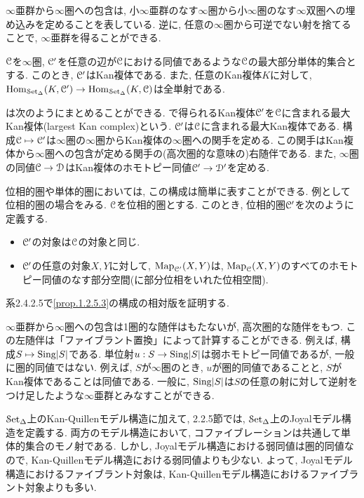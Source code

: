 \documentclass[uplatex, a4paper, 14Q, dvipdfmx]{jsreport}
\begin{document}
$\infty$亜群から$\infty$圏への包含は, 小$\infty$亜群のなす$\infty$圏から小$\infty$圏のなす$\infty$双圏への埋め込みを定めることを表している. 
逆に, 任意の$\infty$圏から可逆でない射を捨てることで, $\infty$亜群を得ることができる. 

\begin{proposition} \label{prop.1.2.5.3}
  $\mathcal{C}$を$\infty$圏, $\mathcal{C}'$を任意の辺が$\mathcal{C}$における同値であるような$\mathcal{C}$の最大部分単体的集合とする. 
  このとき, $\mathcal{C}'$はKan複体である. 
  また, 任意のKan複体$K$に対して, $\mathrm{Hom}_{\mathcal{S}\mathrm{et}_{\Delta}}(K,\mathcal{C}') \to \mathrm{Hom}_{\mathcal{S}\mathrm{et}_{\Delta}}(K,\mathcal{C})$は全単射である. 
\end{proposition}

は次のようにまとめることができる. 
で得られるKan複体$\mathcal{C}'$を$\mathcal{C}$に含まれる最大Kan複体(largest Kan complex)という.
$\mathcal{C}'$は$\mathcal{C}$に含まれる最大Kan複体である. 
構成$\mathcal{C} \mapsto \mathcal{C}'$は$\infty$圏の$\infty$圏からKan複体の$\infty$圏への関手を定める. 
この関手はKan複体から$\infty$圏への包含が定める関手の(高次圏的な意味の)右随伴である. 
また, $\infty$圏の同値$\mathcal{C} \to \mathcal{D}$はKan複体のホモトピー同値$\mathcal{C}' \to \mathcal{D}'$を定める. 

\begin{remark} \label{rem.1.2.5.4}
  位相的圏や単体的圏においては, この構成は簡単に表すことができる. 
  例として位相的圏の場合をみる. 
  $\mathcal{C}$を位相的圏とする. 
  このとき, 位相的圏$\mathcal{C}'$を次のように定義する. 
  \begin{itemize}
    \item $\mathcal{C}'$の対象は$\mathcal{C}$の対象と同じ.
    \item $\mathcal{C}'$の任意の対象$X,Y$に対して, $\mathrm{Map}_{\mathcal{C}'}(X,Y)$は, $\mathrm{Map}_{\mathcal{C}}(X,Y)$のすべてのホモトピー同値のなす部分空間(に部分位相をいれた位相空間). 
  \end{itemize}
\end{remark}

\begin{remark} \label{rem.1.2.5.5}
  系2.4.2.5で\cref{prop.1.2.5.3}の構成の相対版を証明する.
\end{remark}

$\infty$亜群から$\infty$圏への包含は1圏的な随伴はもたないが, 高次圏的な随伴をもつ. 
この左随伴は「ファイブラント置換」によって計算することができる.
例えば, 構成$S \mapsto \mathrm{Sing}|S|$である. 
単位射$u : S \to \mathrm{Sing}|S|$は弱ホモトピー同値であるが, 一般に圏的同値ではない.
例えば, $S$が$\infty$圏のとき, $u$が圏的同値であることと, $S$がKan複体であることは同値である. 
一般に, $\mathrm{Sing}|S|$は$S$の任意の射に対して逆射をつけ足したような$\infty$亜群とみなすことができる.

\begin{remark} \label{rem.1.2.5.6}
  $\mathcal{S}\mathrm{et}_{\Delta}$上のKan-Quillenモデル構造に加えて, 2.2.5節では, $\mathcal{S}\mathrm{et}_{\Delta}$上のJoyalモデル構造を定義する. 
  両方のモデル構造において, コファイブレーションは共通して単体的集合のモノ射である.
  しかし, Joyalモデル構造における弱同値は圏的同値なので, Kan-Quillenモデル構造における弱同値よりも少ない. 
  よって, Joyalモデル構造におけるファイブラント対象は, Kan-Quillenモデル構造におけるファイブラント対象よりも多い. 
\end{remark}
\end{document}
